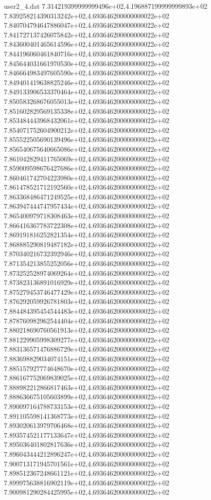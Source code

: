 \begin{filecontents}{user2_4.dat}
7.314219399999999496e+02,4.196887199999999893e+02
7.839258214390313242e+02,4.693646200000000022e+02
7.840704794647886047e+02,4.693646200000000022e+02
7.841727137426075842e+02,4.693646200000000022e+02
7.843600401465614596e+02,4.693646200000000022e+02
7.844196060461840716e+02,4.693646200000000022e+02
7.845644031661970530e+02,4.693646200000000022e+02
7.846664983497605590e+02,4.693646200000000022e+02
7.849401419638825246e+02,4.693646200000000022e+02
7.849133906533370464e+02,4.693646200000000022e+02
7.850583268676055013e+02,4.693646200000000022e+02
7.851602829569135338e+02,4.693646200000000022e+02
7.853484443968432061e+02,4.693646200000000022e+02
7.854071752604900212e+02,4.693646200000000022e+02
7.855522505690139496e+02,4.693646200000000022e+02
7.856540675640665086e+02,4.693646200000000022e+02
7.861042829411765069e+02,4.693646200000000022e+02
7.859009598676427686e+02,4.693646200000000022e+02
7.860461742704223980e+02,4.693646200000000022e+02
7.861478521712192560e+02,4.693646200000000022e+02
7.863368486471249525e+02,4.693646200000000022e+02
7.863947444747957434e+02,4.693646200000000022e+02
7.865400979718308463e+02,4.693646200000000022e+02
7.866416367783722308e+02,4.693646200000000022e+02
7.869191816252821354e+02,4.693646200000000022e+02
7.868885290819487182e+02,4.693646200000000022e+02
7.870340216732392946e+02,4.693646200000000022e+02
7.871354213855252056e+02,4.693646200000000022e+02
7.873252528974069264e+02,4.693646200000000022e+02
7.873823136891016929e+02,4.693646200000000022e+02
7.875279453746477429e+02,4.693646200000000022e+02
7.876292059926781803e+02,4.693646200000000022e+02
7.884484395454544483e+02,4.693646200000000022e+02
7.878760982962544404e+02,4.693646200000000022e+02
7.880218690760561913e+02,4.693646200000000022e+02
7.881229905998309277e+02,4.693646200000000022e+02
7.883136571476886729e+02,4.693646200000000022e+02
7.883698829034074151e+02,4.693646200000000022e+02
7.885157927774648670e+02,4.693646200000000022e+02
7.886167752069839025e+02,4.693646200000000022e+02
7.888982212866817463e+02,4.693646200000000022e+02
7.888636675105603899e+02,4.693646200000000022e+02
7.890097164788733153e+02,4.693646200000000022e+02
7.891105598141368773e+02,4.693646200000000022e+02
7.893020613979706468e+02,4.693646200000000022e+02
7.893574521177133647e+02,4.693646200000000022e+02
7.895036401802817636e+02,4.693646200000000022e+02
7.896043444212896247e+02,4.693646200000000022e+02
7.900713171945701561e+02,4.693646200000000022e+02
7.898512367248661121e+02,4.693646200000000022e+02
7.899975638816902119e+02,4.693646200000000022e+02
7.900981290284425995e+02,4.693646200000000022e+02

\end{filecontents}
